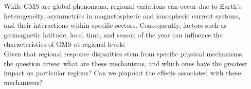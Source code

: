 \documentclass[12pt]{article}
\begin{document}
While GMS are global phenomena, regional variations can occur due to Earth's heterogeneity, asymmetries in magnetospheric and ionospheric current systems, and their interactions within specific sectors. Consequently, factors such as geomagnetic latitude, local time, and season of the year can influence the characteristics of GMS at regional levels.\\



Given that regional response disparities stem from specific physical mechanisms, the question arises: what are these mechanisms, and which ones have the greatest impact on particular regions? Can we pinpoint the effects associated with these mechanisms?
\end{document}
